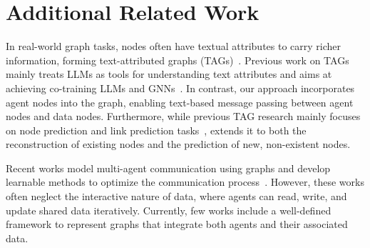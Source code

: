 \vspace{-3mm}
\section{Additional Related Work}

 In real-world graph tasks, nodes often have textual attributes to carry richer information, forming text-attributed graphs (TAGs)~\citep{yang2021graphformers, he2023explanations}. 
Previous work on TAGs mainly treats LLMs as tools for understanding text attributes and aims at achieving co-training LLMs and GNNs~\citep{Zhao2022LearningOL,Chen2023LabelfreeNC}. In contrast, our approach incorporates agent nodes into the graph, enabling text-based message passing between agent nodes and data nodes. Furthermore, while previous TAG research mainly focuses on node prediction and link prediction tasks~\citep{yan2023comprehensive}, \envname extends it to both the reconstruction of existing nodes and the prediction of new, non-existent nodes.


 Recent works model multi-agent communication using graphs and develop learnable methods to optimize the communication process~\citep{zhuge2024language, martinkus2022agent, hu2024learning}. However, these works often neglect the interactive nature of data, where agents can read, write, and update shared data iteratively. Currently, few works include a well-defined framework to represent graphs that integrate both agents and their associated data.

